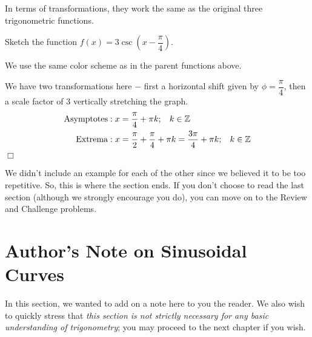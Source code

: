 \documentclass[lang=en,11pt]{elegantbook}
\begin{document}
\begin{wrapfigure}{r}{5cm}
\end{wrapfigure}

In terms of transformations, they work the same as the original three trigonometric functions.

\begin{example}
Sketch the function $f(x)=3\csc\left(x-\dfrac{\pi}{4}\right)$.
\end{example}
\begin{solution}
We use the same color scheme as in the parent functions above.

We have two transformations here $-$ first a horizontal shift given by $\phi=\dfrac{\pi}{4}$, then a scale factor of $3$ vertically stretching the graph.
\begin{align*}
    \text{Asymptotes}&: x=\dfrac{\pi}{4}+\pi k;\hspace{3mm} k\in\mathbb{Z} \\
    \text{Extrema}&: x=\dfrac{\pi}{2}+\dfrac{\pi}{4}+\pi k=\dfrac{3\pi}{4}+\pi k;\hspace{3mm} k\in\mathbb{Z}
\end{align*} $\Box$
\end{solution}
We didn't include an example for each of the other since we believed it to be too repetitive.  So, this is where the section ends.  If you don't choose to read the last section (although we strongly encourage you do), you can move on to the Review and Challenge problems.
\section{Author's Note on Sinusoidal Curves}
\noindent In this section, we wanted to add on a note here to you the reader. We also wish to quickly stress that \textit{this section is not strictly necessary for any basic understanding of trigonometry}; you may proceed to the next chapter if you wish.
\end{document}
